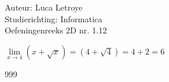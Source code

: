 \documentclass[a4paper]{article}
\begin{document}
  
\noindent \large Auteur: Luca Letroye \\
\noindent \large Studierichting: Informatica\\
\noindent \large Oefeningenreeks 2D nr. 1.12\\

\medskip

\normalsize

$\lim\limits_{x\rightarrow 4}(x+\sqrt{x}) = (4+\sqrt{4}) = 4 +2 = 6$


\begin{thebibliography}{999}
\end{thebibliography}
\end{document}
